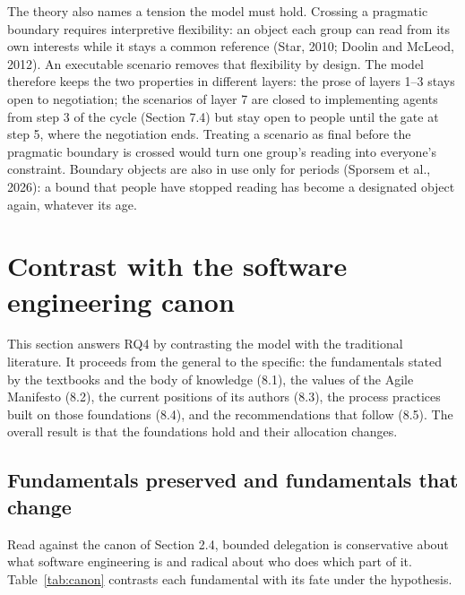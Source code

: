 \documentclass[11pt]{article}
\begin{document}
The theory also names a tension the model must hold. Crossing a pragmatic boundary requires interpretive flexibility: an object each group can read from its own interests while it stays a common reference (Star, 2010; Doolin and McLeod, 2012). An executable scenario removes that flexibility by design. The model therefore keeps the two properties in different layers: the prose of layers 1--3 stays open to negotiation; the scenarios of layer 7 are closed to implementing agents from step 3 of the cycle (Section 7.4) but stay open to people until the gate at step 5, where the negotiation ends. Treating a scenario as final before the pragmatic boundary is crossed would turn one group's reading into everyone's constraint. Boundary objects are also in use only for periods (Sporsem et al., 2026): a bound that people have stopped reading has become a designated object again, whatever its age.

\section{Contrast with the software engineering canon}

This section answers RQ4 by contrasting the model with the traditional literature. It proceeds from the general to the specific: the fundamentals stated by the textbooks and the body of knowledge (8.1), the values of the Agile Manifesto (8.2), the current positions of its authors (8.3), the process practices built on those foundations (8.4), and the recommendations that follow (8.5). The overall result is that the foundations hold and their allocation changes.

\subsection{Fundamentals preserved and fundamentals that change}

Read against the canon of Section 2.4, bounded delegation is conservative about what software engineering is and radical about who does which part of it. Table~\ref{tab:canon} contrasts each fundamental with its fate under the hypothesis.
\end{document}
